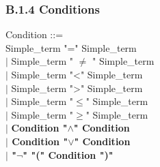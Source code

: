 \documentclass[12pt,a4paper,draft]{article}
\begin{document}
\subsubsection{B.1.4 Conditions }
\footnotesize{
\begin{sloppypar} 

Condition ::= \\
\hspace*{0.20in}   Simple\_term  "="  Simple\_term\\
\hspace*{0.20in} $|$  Simple\_term  " $\ne$  "  Simple\_term\\
\hspace*{0.20in} $|$  Simple\_term  "<"  Simple\_term  \\
\hspace*{0.20in} $|$  Simple\_term  ">"  Simple\_term  \\
\hspace*{0.20in} $|$  Simple\_term  "$\leq$"  Simple\_term\\
\hspace*{0.20in} $|$  Simple\_term  "$\geq$"  Simple\_term\\
\hspace*{0.20in} $|$ \textbf{ Condition  "$\land$"  Condition\\
\hspace*{0.20in} $|$  Condition  "$\lor$"  Condition\\
\hspace*{0.20in} $|$ "$\neg$" "(" Condition ")"} \\
 

\end{sloppypar}}
\end{document}
